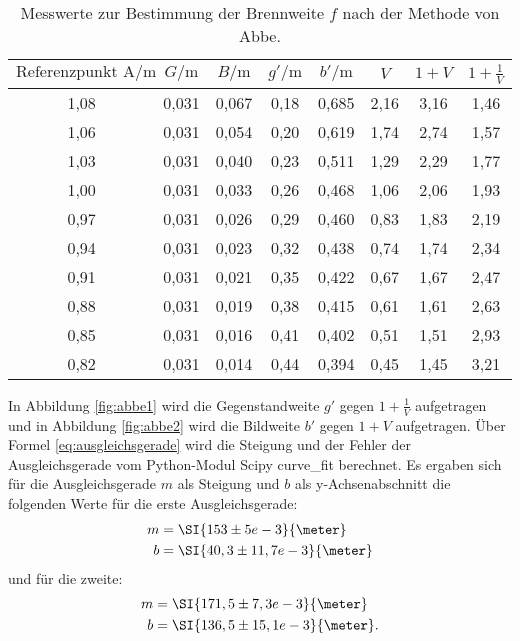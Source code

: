 \begin{table}[htpb]
	\centering
	\caption{Messwerte zur Bestimmung der Brennweite $f$ nach der Methode von Abbe.}
	\label{tab:dritterVersuchsteil}
	\begin{tabular}{c c c c c c c c}
		\toprule
		$\text{Referenzpunkt A} / \si{\meter}$ &$G / \si{\meter}$ & $B / \si{\meter}$ & $g' / \si{\meter}$ & $b' / \si{\meter}$ & $V$ & $1+V$ & $1 + \frac{1}{V}$ \\
		\midrule
         1,08 &0,031 & 0,067 & 0,18 & 0,685 & 2,16 & 3,16 & 1,46 \\
         1,06 &0,031 & 0,054 & 0,20 & 0,619 & 1,74 & 2,74 & 1,57 \\
         1,03 &0,031 & 0,040 & 0,23 & 0,511 & 1,29 & 2,29 & 1,77 \\
         1,00 &0,031 & 0,033 & 0,26 & 0,468 & 1,06 & 2,06 & 1,93 \\ 
         0,97 &0,031 & 0,026 & 0,29 & 0,460 & 0,83 & 1,83 & 2,19 \\
         0,94 &0,031 & 0,023 & 0,32 & 0,438 & 0,74 & 1,74 & 2,34 \\
         0,91 &0,031 & 0,021 & 0,35 & 0,422 & 0,67 & 1,67 & 2,47 \\
         0,88 &0,031 & 0,019 & 0,38 & 0,415 & 0,61 & 1,61 & 2,63 \\
         0,85 &0,031 & 0,016 & 0,41 & 0,402 & 0,51 & 1,51 & 2,93 \\
         0,82 &0,031 & 0,014 & 0,44 & 0,394 & 0,45 & 1,45 & 3,21 \\
		\bottomrule
	\end{tabular}
\end{table}

In Abbildung \ref{fig:abbe1} wird die Gegenstandweite $g'$ gegen $1+\frac{1}{V}$ aufgetragen und in Abbildung \ref{fig:abbe2} wird die Bildweite $b'$ gegen $1+V$ aufgetragen. Über Formel \ref{eq:ausgleichsgerade} wird die Steigung und der Fehler der Ausgleichsgerade vom Python-Modul Scipy curve\_fit berechnet.
Es ergaben sich für die Ausgleichsgerade $m$ als Steigung und $b$ als y-Achsenabschnitt die folgenden Werte für die erste Ausgleichsgerade:
\begin{align*}
m &= \SI{153 \pm 5 e-3}{\meter} \\
b &= \SI{40,3 \pm 11,7 e-3}{\meter}
\end{align*}
und für die zweite:
\begin{align*}
m &= \SI{171,5 \pm 7,3 e-3}{\meter} \\
b &= \SI{136,5 \pm 15,1 e-3}{\meter}.
\end{align*}

